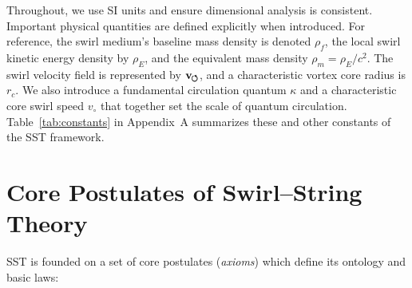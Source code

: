 \documentclass[10pt,reprint,aps,onecolumn,nofootinbib]{revtex4-2}
\newcommand{\swirlarrow}{%
    \mathchoice{\mkern-2mu\scriptstyle\boldsymbol{\circlearrowleft}}%
    {\mkern-2mu\scriptstyle\boldsymbol{\circlearrowleft}}%
    {\mkern-2mu\scriptstyle\boldsymbol{\circlearrowleft}}%
    {\mkern-2mu\scriptscriptstyle\boldsymbol{\circlearrowleft}}%
}
\newcommand{\vswirl}{\mathbf{v}_{\swirlarrow}}
\newcommand{\rhoE}{\rho_{\!E}}                           %
\newcommand{\rc}{r_c}                                    %
\providecommand{\rc}{r_c}
\newcommand{\rhoF}{\rho_{\!f}}     %
\newcommand{\rhoM}{\rho_{\!m}}     %
\begin{document}
Throughout, we use SI units and ensure dimensional analysis is consistent. Important physical quantities are defined explicitly when introduced. For reference, the swirl medium’s baseline mass density is denoted $\rhoF$, the local swirl kinetic energy density by $\rhoE$, and the equivalent mass density $\rhoM = \rhoE/c^2$. The swirl velocity field is represented by $\vswirl$, and a characteristic vortex core radius is $\rc$. We also introduce a fundamental circulation quantum $\kappa$ and a characteristic core swirl speed $v_{\circ}$ that together set the scale of quantum circulation. Table~\ref{tab:constants} in Appendix~A summarizes these and other constants of the SST framework.


\section{Core Postulates of Swirl–String Theory}

SST is founded on a set of core postulates (\emph{axioms}) which define its ontology and basic laws:
\end{document}
